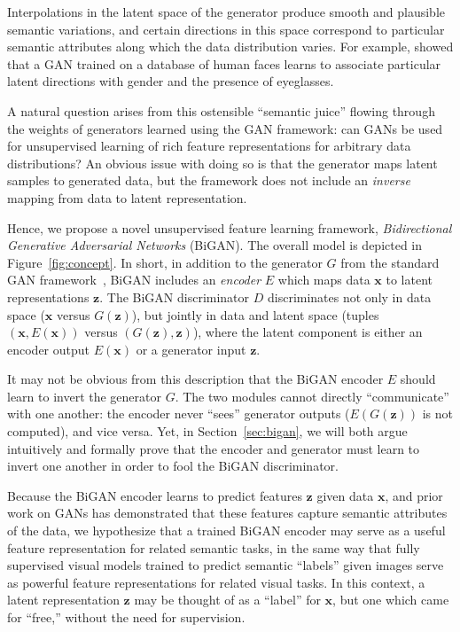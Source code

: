 \documentclass{article}
\renewcommand{\vec}[1]{\mathbf{#1}}
\newcommand{\x}{\vec{x}}
\newcommand{\z}{\vec{z}}
\newcommand{\reffig}[1]{Figure~\ref{fig:#1}}
\begin{document}
Interpolations in the latent space of the generator produce smooth and plausible semantic variations,
and certain directions in this space correspond to particular semantic attributes along which the data distribution varies.
For example, \citet{dcgan} showed that a GAN trained on a database of human faces learns to associate particular latent directions with gender and the presence of eyeglasses.


A natural question arises from this ostensible ``semantic juice'' flowing through the weights of generators learned using the GAN framework:
can GANs be used for unsupervised learning of rich feature representations for arbitrary data distributions?
An obvious issue with doing so is that the generator maps latent samples to generated data,
but the framework does not include an \textit{inverse} mapping from data to latent representation.

Hence, we propose a novel unsupervised feature learning framework,
\textit{Bidirectional Generative Adversarial Networks} (BiGAN).
The overall model is depicted in \reffig{concept}.
In short, in addition to the generator $G$ from the standard GAN framework~\citep{gan},
BiGAN includes an \textit{encoder} $E$ which maps data $\x$ to latent representations $\z$.
The BiGAN discriminator $D$ discriminates not only in data space ($\x$ versus $G(\z)$),
but jointly in data and latent space (tuples $(\x, E(\x))$ versus $(G(\z), \z)$),
where the latent component is either an encoder output $E(\x)$ or a generator input $\z$.

It may not be obvious from this description that the BiGAN encoder $E$ should learn to invert the generator $G$.
The two modules cannot directly ``communicate'' with one another:
the encoder never ``sees'' generator outputs ($E(G(\z))$ is not computed), and vice versa.
Yet, in Section~\ref{sec:bigan}, we will both argue intuitively and formally prove that the encoder and generator
must learn to invert one another in order to fool the BiGAN discriminator.

Because the BiGAN encoder learns to predict features $\z$ given data $\x$,
and prior work on GANs has demonstrated that these features capture semantic attributes of the data,
we hypothesize that a trained BiGAN encoder may serve as a useful feature representation for related semantic tasks,
in the same way that fully supervised visual models trained to predict semantic ``labels'' given images
serve as powerful feature representations for related visual tasks.
In this context, a latent representation $\z$ may be thought of as a ``label'' for $\x$,
but one which came for ``free,'' without the need for supervision.
\end{document}
